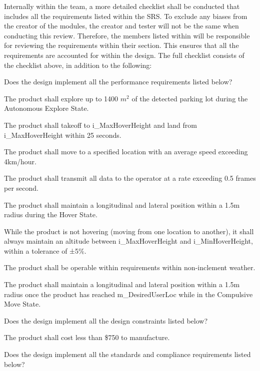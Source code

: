 \documentclass[12pt, titlepage]{article}
\begin{document}
Internally within the team, a more detailed checklist shall be conducted that includes all the requirements listed within the SRS. To exclude any biases from the creator of the modules, the creator and tester will not be the same when conducting this review. Therefore, the members listed within \label{VnV_Team} will be responsible for reviewing the requirements within their section. This ensures that all the requirements are accounted for within the design. The full checklist consists of the checklist above, in addition to the following: 

\begin{todolist}
\label{Design2_Checklist}
\item Does the design implement all the performance requirements listed below?
\begin{todolist}
    \item The product shall explore up to 1400 $m^2$ of the detected parking lot during the Autonomous Explore State.
    \item The product shall takeoff to i\_MaxHoverHeight and land from i\_MaxHoverHeight within 25 seconds.
    \item The product shall move to a specified location with an average speed exceeding 4km/hour.
    \item The product shall transmit all data to the operator at a rate exceeding 0.5 frames per second.
    \item The product shall maintain a longitudinal and lateral position within a 1.5m radius during the Hover State.
    \item While the product is not hovering (moving from one location to another), it shall always maintain an altitude between i\_MaxHoverHeight and i\_MinHoverHeight, within a tolerance of ±5\%.
    \item The product shall be operable within requirements within non-inclement weather.
    \item The product shall maintain a longitudinal and lateral position within a 1.5m radius once the product has reached m\_DesiredUserLoc while in the Compulsive Move State.
\end{todolist}
\item Does the design implement all the design constraints listed below?
\begin{todolist}
    \item The product shall cost less than \$750 to manufacture.
\end{todolist}
\item Does the design implement all the standards and compliance requirements listed below?

\end{todolist}
\end{document}
